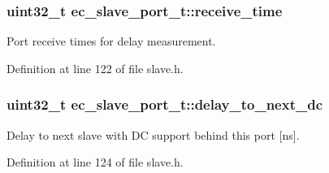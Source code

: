 \subsubsection[{receive\-\_\-time}]{\setlength{\rightskip}{0pt plus 5cm}uint32\-\_\-t ec\-\_\-slave\-\_\-port\-\_\-t\-::receive\-\_\-time}\label{structec__slave__port__t_a4e7c3832a518186c4f1a5bc32a192eb9}


Port receive times for delay measurement. 



Definition at line 122 of file slave.\-h.

\subsubsection[{delay\-\_\-to\-\_\-next\-\_\-dc}]{\setlength{\rightskip}{0pt plus 5cm}uint32\-\_\-t ec\-\_\-slave\-\_\-port\-\_\-t\-::delay\-\_\-to\-\_\-next\-\_\-dc}\label{structec__slave__port__t_ad9c8ad9fc7ebd5681eb72951b1716cc5}


Delay to next slave with D\-C support behind this port [ns]. 



Definition at line 124 of file slave.\-h.

